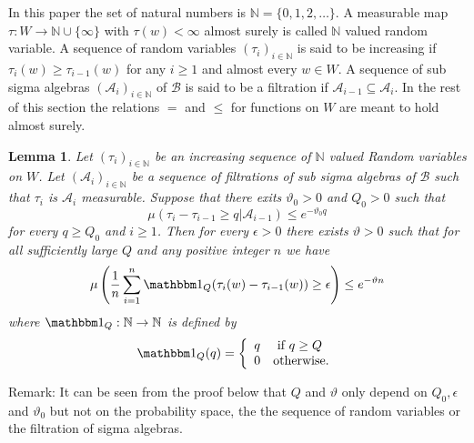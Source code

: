\documentclass[12pt]{amsart}
\newtheorem{lem}[thm]{Lemma}
\theoremstyle{definition}
\theoremstyle{remark}
\numberwithin{equation}{section}
\begin{document}
In this paper the set of natural numbers is  $\mathbb N=\{0, 1, 2, \ldots\}$.
A measurable map $\tau: W \to { \mathbb N}\cup \{\infty\}$ with $\tau(w)<\infty$ almost surely  is called  ${\mathbb N}$ valued random variable. 
A sequence of random variables $(\tau_i)_{i\in \mathbb N}$ is said to be  
increasing if $\tau_i(w)\ge \tau_{i-1}(w)$ for any $i\ge 1$ and almost every $w\in W$. 
A sequence of   sub sigma algebras  $(\mathcal A_i)_{i\in \mathbb N}$
of  $\mathcal B$ is said to 
be a filtration if 
$\mathcal A_{i-1}\subseteq \mathcal A_{i}$.
In the rest of  this section the relations $=$ and $\le $ for functions on $W$ are meant
to hold almost surely. 

\begin{lem}\label{lem;main}
Let $(\tau_i)_{i\in \mathbb N}$ be an  increasing sequence  of
${\mathbb N}$ valued  Random variables  on $W$.  Let $(\mathcal A_i)_{i\in \mathbb N}$ be a sequence of 
filtrations of sub sigma algebras of $\mathcal B$ such that $\tau_i$ is $\mathcal A_i$ measurable. 
Suppose that there exits $\vartheta_0>0$ and $Q_0 >0$ such that  
\begin{equation}\label{eq;basic exp}
\mu(\tau_{i}-\tau_{i-1}\ge  q|\mathcal A_{i-1})\le e^{-\vartheta_0 q}
\end{equation}
for every $q\ge Q_0$ and $i\ge 1$.
Then  for every $\epsilon>0$
there exists  $\vartheta>0$ such that for 
all sufficiently large $Q$
and  any positive integer  $n$  we have
\begin{equation}\label{eq;goaldev}
\mu\left( \frac{1}{n}\sum_{i=1}^n \mathbbm 1 _Q ( \tau_{i}(w)-\tau_{i-1}(w))\ge \epsilon\right)
\le e^{-\vartheta n}
\end{equation}
where 
$ \mathbbm 1 _Q: {\mathbb N}\to  {\mathbb N} $ is defined by \begin{equation}\label{eq;truncation}
 \mathbbm 1 _Q(q)=\left\{
\begin{array}{cl}
q & \mbox{ if } q\ge Q \\
0 & \mbox{otherwise.}
\end{array}
\right.
\end{equation}
\end{lem}
Remark:
It can be seen from the proof below that $Q$ and $\vartheta$ only depend on $Q_0,\epsilon$ and $\vartheta_0$ but not 
on 
the probability space, 
the the sequence of random variables or the filtration of sigma algebras. 
\end{document}
